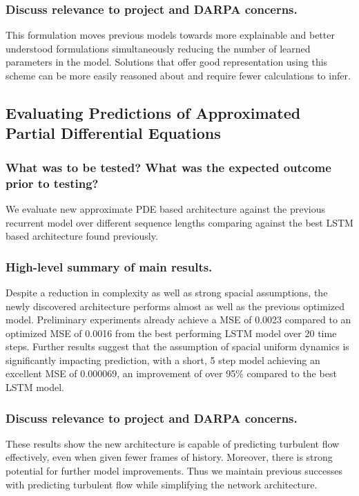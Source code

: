 \documentclass[12pt]{article}
\theoremstyle{plain}
\theoremstyle{remark}
\theoremstyle{definition}
\begin{document}
\subsubsection{Discuss relevance to project and DARPA concerns.}
This formulation moves previous models towards more explainable and better understood formulations simultaneously reducing the number of learned parameters in the model. Solutions that offer good representation using this scheme can be more easily reasoned about and require fewer calculations to infer.

\subsection{Evaluating Predictions of Approximated Partial Differential Equations}

\subsubsection{What was to be tested? What was the expected outcome prior to testing?}
We evaluate new approximate PDE based architecture against the previous recurrent model over different sequence lengths comparing against the best LSTM based architecture found previously. 


\subsubsection{High-level summary of main results.}
Despite a reduction in complexity as well as strong spacial assumptions, the newly discovered architecture performs almost as well as the previous optimized model. Preliminary experiments already achieve a MSE of 0.0023 compared to an optimized MSE of 0.0016 from the best performing LSTM model over 20 time steps. Further results suggest that the assumption of spacial uniform dynamics is significantly impacting prediction, with a short, 5 step model achieving an excellent MSE of 0.000069, an improvement of over 95\% compared to the best LSTM model.

\subsubsection{Discuss relevance to project and DARPA concerns.}
These results show the new architecture is capable of predicting turbulent flow effectively, even when given fewer frames of history. Moreover, there is strong potential for further model improvements. Thus we maintain previous successes with predicting turbulent flow while simplifying the network architecture.
\end{document}
